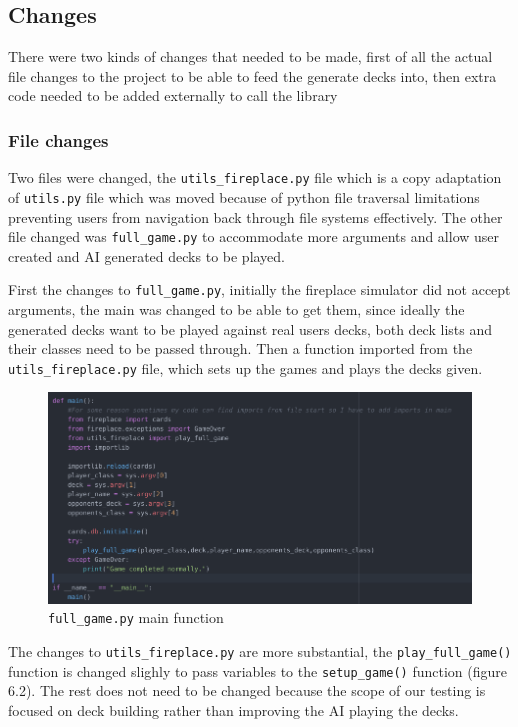 \documentclass{report} %
\begin{document}
\subsection{Changes}
There were two kinds of changes that needed to be made, first of all the actual file changes to the project to be able to feed the generate decks into, then extra code needed to be added externally to call the library
\subsubsection{File changes}
Two files were changed, the \nolinkurl{utils_fireplace.py} file which is a copy adaptation of \nolinkurl{utils.py} file which was moved because of python file traversal limitations preventing users from navigation back through file systems effectively. The other file changed was \nolinkurl{full_game.py} to accommodate more arguments and allow user created and AI generated decks to be played.

First the changes to \nolinkurl{full_game.py}, initially the fireplace simulator did not accept arguments, the main was changed to be able to get them, since ideally the generated decks want to be played against real users decks, both deck lists and their classes need to be passed through. Then a function imported from the \nolinkurl{utils_fireplace.py} file, which sets up the games and plays the decks given. 

\begin{figure}[H]
\centering
\includegraphics[width=1.25\textwidth]{simMain}
\caption{\nolinkurl{full_game.py} main function \protect}
 \label{board}
\end{figure}

The changes to \nolinkurl{utils_fireplace.py} are more substantial, the \nolinkurl{play_full_game()} function is changed slighly to pass variables to the \nolinkurl{setup_game()} function (figure 6.2). The rest does not need to be changed because the scope of our testing is focused on deck building rather than improving the AI playing the decks. 
\end{document}
